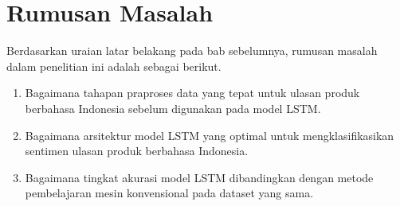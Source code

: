 
\chapter{Rumusan Masalah}

Berdasarkan uraian latar belakang pada bab sebelumnya, rumusan
masalah dalam penelitian ini adalah sebagai berikut.
\begin{enumerate}
  \item Bagaimana tahapan praproses data yang tepat untuk ulasan
        produk berbahasa Indonesia sebelum digunakan pada model LSTM.
  \item Bagaimana arsitektur model LSTM yang optimal untuk
        mengklasifikasikan sentimen ulasan produk berbahasa Indonesia.
  \item Bagaimana tingkat akurasi model LSTM dibandingkan dengan
        metode pembelajaran mesin konvensional pada dataset yang sama.
\end{enumerate}
